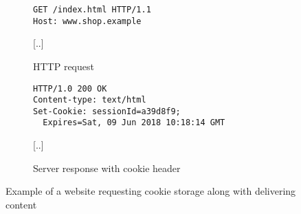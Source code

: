 \begin{figure}
\begin{subfigure}[t]{.5\textwidth}
\begin{verbatim}
GET /index.html HTTP/1.1
Host: www.shop.example
\end{verbatim}
\vspace{2.55em}
[..]
\caption{HTTP request}
\end{subfigure}%
\medskip
\begin{subfigure}[t]{.5\textwidth}
\begin{verbatim}
HTTP/1.0 200 OK
Content-type: text/html
Set-Cookie: sessionId=a39d8f9;
  Expires=Sat, 09 Jun 2018 10:18:14 GMT
\end{verbatim}
[..]
\caption{Server response with cookie header}
\end{subfigure}
\caption{Example of a website requesting cookie storage along with delivering content}\label{fig:set-cookie}
\end{figure}
